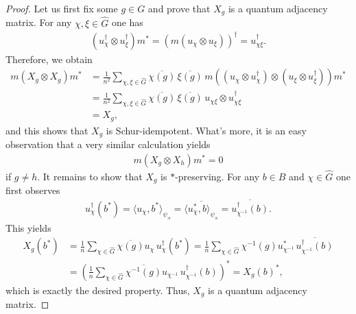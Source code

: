 \documentclass{amsart}
\theoremstyle{definition}
\theoremstyle{definition}
\begin{document}
\begin{proof}
    Let us first fix some $g \in G$ and prove that $X_g$ is a quantum adjacency matrix. For any $\chi, \xi \in \hat{G}$ one has
    \begin{align*}
        (u_\chi^\dagger \otimes u_\xi^\dagger) m^\ast = \left( m (u_\chi \otimes u_\xi) \right)^\dagger = u_{\chi \xi}^\dagger.
    \end{align*}
    Therefore, we obtain
    \begin{align*}
        m(X_g \otimes X_g) m^\ast
            &= \frac{1}{n^2} \sum_{\chi, \xi \in \hat{G}} \overline{\chi(g)} \, \overline{\xi(g)} \, m\left( (u_\chi \otimes u_\chi^\dagger) \otimes (u_\xi \otimes u_\xi^\dagger) \right) m^\ast \\
            &= \frac{1}{n^2} \sum_{\chi, \xi \in \hat{G}} \overline{\chi(g)} \, \overline{\xi(g)} \, u_{\chi \xi} \otimes u_{\chi \xi}^\dagger \\
            &= X_g,
    \end{align*}
    and this shows that $X_g$ is Schur-idempotent. What's more, it is an easy observation that a very similar calculation yields
    \begin{align*}
        m(X_g \otimes X_h) m^\ast = 0
    \end{align*}
    if $g \neq h$.
    It remains to show that $X_g$ is $\ast$-preserving. For any $b \in B$ and $\chi \in \hat{G}$ one first observes
    \begin{align*}
        u_\chi^\dagger(b^\ast) = \langle u_\chi, b^\ast \rangle_{\psi_\rtimes}
            = \overline{\langle u_\chi^\ast, b \rangle_{\psi_\rtimes}}
            = \overline{u_{\chi^{-1}}^\dagger (b)}.  
    \end{align*}
    This yields
    \begin{align*}
        X_g(b^\ast) &= \frac{1}{n} \sum_{\chi \in \hat{G}} \overline{\chi(g)} u_\chi \, u_\chi^\dagger(b^\ast) 
            = \frac{1}{n} \sum_{\chi \in \hat{G}} \chi^{-1}(g) u_{\chi^{-1}}^\ast \, \overline{u_{\chi^{-1}}^\dagger(b)} \\
            &= \left( \frac{1}{n} \sum_{\chi \in \hat{G}} \overline{\chi^{-1}(g)} u_{\chi^{-1}} \, u_{\chi^{-1}}^\dagger(b) \right)^\ast
            = X_g(b)^\ast,
    \end{align*}
    which is exactly the desired property. Thus, $X_g$ is a quantum adjacency matrix.


\end{proof}
\end{document}
